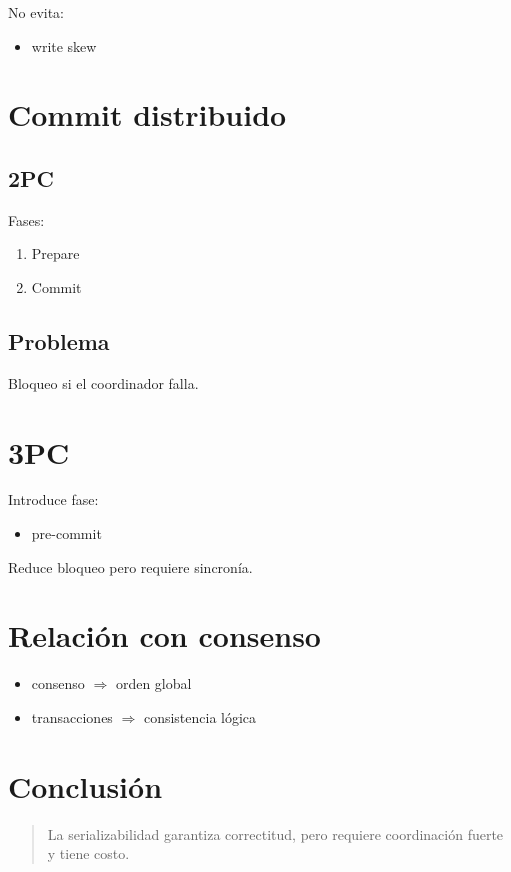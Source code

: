 \documentclass[variant=apuntes,cover=institutional,mode=screen]{ua-engineering-v6-article}
\begin{document}
No evita:
\begin{itemize}
\item write skew
\end{itemize}

\section{Commit distribuido}

\subsection{2PC}

Fases:
\begin{enumerate}
\item Prepare
\item Commit
\end{enumerate}

\subsection{Problema}
Bloqueo si el coordinador falla.

\section{3PC}

Introduce fase:
\begin{itemize}
\item pre-commit
\end{itemize}

Reduce bloqueo pero requiere sincronía.

\section{Relación con consenso}

\begin{itemize}
\item consenso $\Rightarrow$ orden global
\item transacciones $\Rightarrow$ consistencia lógica
\end{itemize}

\section{Conclusión}

\begin{quote}
La serializabilidad garantiza correctitud, pero requiere coordinación fuerte y tiene costo.
\end{quote}
\end{document}
